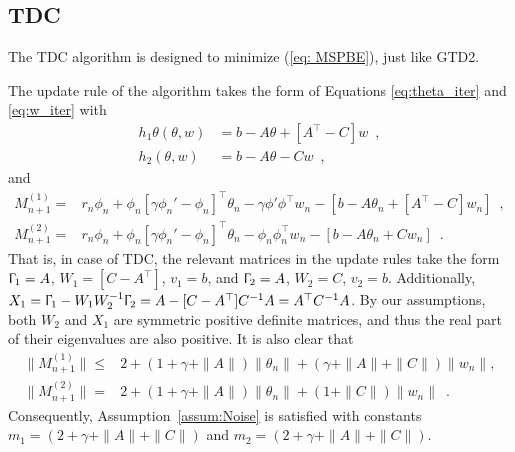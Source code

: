 \documentclass[usenames,dvipsnames,final,12pt]{colt2018} %
\newcommand{\bE}{\mathbb{E}}
\newcommand{\Xt}{X_1}
\newcommand{\Wt}{W_1}
\newcommand{\Tt}{\Upgamma_1}
\newcommand{\Mt}{M^{(1)}}
\newcommand{\mt}{m_1}
\newcommand{\Tw}{\Upgamma_2}
\newcommand{\Ww}{W_2}
\newcommand{\Mw}{M^{(2)}}
\newcommand{\mw}{m_2}
\begin{document}
\subsection{TDC}

The TDC algorithm is designed to minimize (\ref{eq: MSPBE}), just like GTD2.

The update rule of the algorithm takes the form of Equations \eqref{eq:theta_iter} and \eqref{eq:w_iter} with
\begin{align*}
h_1\theta(\theta,w) &= %
b-A\theta + [A^\top-C] w \enspace,
\\
h_2(\theta,w) &= %
b-A\theta -Cw \enspace,
\end{align*}
and
\begin{align*}
\Mt_{n+1} %
=& r_n\phi_n + \phi_n[\gamma\phi_n'-\phi_n]^\top\theta_n - \gamma \phi'\phi^\top w_n - [b-A\theta_n + [A^\top-C] w_n]
\enspace,
\\
\Mw_{n+1} %
=& r_n\phi_n + \phi_n[\gamma\phi_n'-\phi_n]^\top\theta_n - \phi_n\phi_n^\top w_n - [b-A\theta_n +Cw_n]
\enspace.
\end{align*}
That is, in case of TDC, the relevant matrices in the update rules take the form
$\Tt = A$, $\Wt = [C-A^\top]$, $v_1 = b$, and $\Tw=A$, $\Ww=C$, $v_2=b$.
Additionally, $\Xt = \Tt - \Wt\Ww^{-1}\Tw = A - [C-A^\top] C^{-1} A = A^\top C^{-1} A$.
By our assumptions, both $\Ww$ and $\Xt$ are symmetric positive definite matrices, and thus the real part of their eigenvalues are also positive.
%
It is also clear that
\begin{align*}
\|\Mt_{n+1}\| \leq&  2+(1+\gamma+\|A\|) \|\theta_n\| +(\gamma+\|A\|+\|C\|) \|w_n\|, \\
\|\Mw_{n+1}\| =& 2+(1+\gamma+\|A\|) \|\theta_n\|+(1+\|C\|) \|w_n\| \enspace.
\end{align*}
Consequently, Assumption~\ref{assum:Noise} is satisfied with constants $\mt = (2+\gamma+\|A\|+\|C\|)$ and $\mw = (2+\gamma+\|A\|+\|C\|)$.
\end{document}
